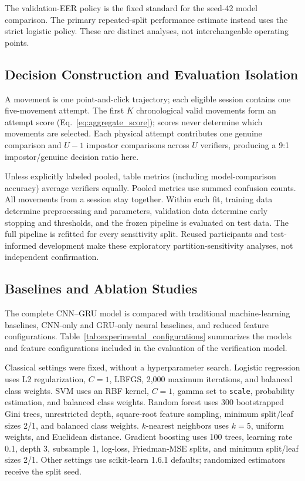 \documentclass[conference]{IEEEtran}
\begin{document}
The validation-EER policy is the fixed standard for the seed-42 model comparison.
The primary repeated-split performance estimate instead uses the strict logistic
policy. These are distinct analyses, not interchangeable operating points.

\subsection{Decision Construction and Evaluation Isolation}

A movement is one point-and-click trajectory; each eligible session contains
one five-movement attempt. The first $K$ chronological valid movements form
an attempt score (Eq.~\ref{eq:aggregate_score}); scores never determine which
movements are selected. Each physical attempt contributes one genuine
comparison and $U-1$ impostor comparisons across $U$ verifiers, producing a
9:1 impostor/genuine decision ratio here.

Unless explicitly labeled pooled, table metrics (including model-comparison
accuracy) average verifiers equally. Pooled metrics use summed confusion
counts. All movements from a session stay together. Within each fit, training
data determine preprocessing and parameters, validation data determine early
stopping and thresholds, and the frozen pipeline is evaluated on test data.
The full pipeline is refitted for every sensitivity split. Reused participants
and test-informed development make these exploratory partition-sensitivity
analyses, not independent confirmation.

\subsection{Baselines and Ablation Studies}

The complete CNN--GRU model is compared with traditional machine-learning baselines, CNN-only and GRU-only neural baselines, and reduced feature configurations. Table~\ref{tab:experimental_configurations} summarizes the models and feature configurations included in the evaluation of the verification model.

Classical settings were fixed, without a hyperparameter search. Logistic
regression uses L2 regularization, $C=1$, LBFGS, 2,000 maximum iterations, and
balanced class weights. SVM uses an RBF kernel, $C=1$, gamma set to
\texttt{scale}, probability estimation, and balanced class weights. Random
forest uses 300 bootstrapped Gini trees, unrestricted depth, square-root
feature sampling, minimum split/leaf sizes 2/1, and balanced class weights.
$k$-nearest neighbors uses $k=5$, uniform weights, and Euclidean distance.
Gradient boosting uses 100 trees, learning rate 0.1, depth 3, subsample 1,
log-loss, Friedman-MSE splits, and minimum split/leaf sizes 2/1. Other settings
use scikit-learn 1.6.1 defaults; randomized estimators receive the split seed.
\end{document}
